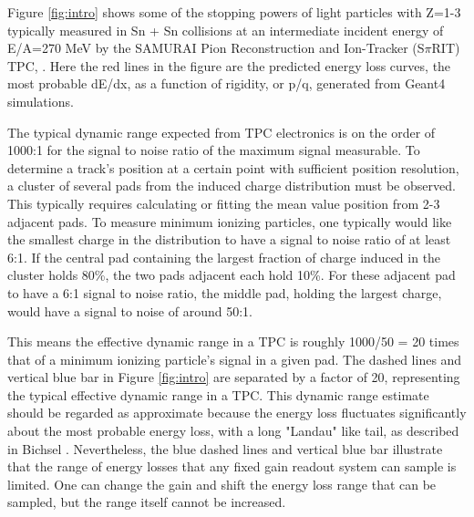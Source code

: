 \documentclass[review]{elsarticle}
\begin{document}
Figure \ref{fig:intro} shows some of the stopping powers of light particles with Z=1-3 typically measured in Sn + Sn collisions at an intermediate incident energy of E/A=270 MeV by the SAMURAI Pion Reconstruction and Ion-Tracker (S$\pi$RIT) TPC, \cite{shane}. Here the red lines in the figure are the predicted energy loss curves, the most probable dE/dx, as a function of rigidity, or p/q, generated from Geant4 \cite{genfit} simulations. 

The typical dynamic range expected from TPC electronics is on the order of 1000:1 for the signal to noise ratio of the maximum signal measurable. To determine a track's position at a certain point with sufficient position resolution, a cluster of several pads from the induced charge distribution must be observed. This typically requires calculating or fitting the mean value position from 2-3 adjacent pads. To measure minimum ionizing particles, one typically would like the smallest charge in the distribution to have a signal to noise ratio of at least 6:1. If the central pad containing the largest fraction of charge induced in the cluster holds 80\%, the two pads adjacent each hold 10\%. For these adjacent pad to have a 6:1 signal to noise ratio, the middle pad, holding the largest charge, would have a signal to noise of around 50:1. 

 This means the effective dynamic range in a TPC is roughly 1000/50 = 20 times that of a minimum ionizing particle's signal in a given pad. The dashed lines and vertical blue bar in Figure \ref{fig:intro} are separated by a factor of 20, representing the typical effective dynamic range in a TPC. This dynamic range estimate should be regarded as approximate because the energy loss fluctuates significantly about the most probable energy loss, with a long "Landau" like tail, as described in Bichsel \cite{bichsel}. Nevertheless, the blue dashed lines and vertical blue bar illustrate that the range of energy losses that any fixed gain readout system can sample is limited. One can change the gain and shift the energy loss range that can be sampled, but the range itself cannot be increased.
\end{document}
